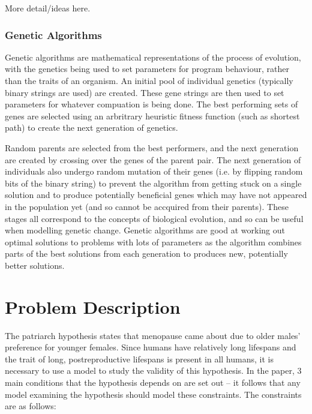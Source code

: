 \documentclass[authoryearcitations]{UoYCSproject}
\begin{document}
\begin{framed}
More detail/ideas here.
\end{framed}


\subsection{Genetic Algorithms}
Genetic algorithms are mathematical representations of the process of evolution, with the genetics being used to set parameters for program behaviour, rather than the traits of an organism. An initial pool of individual genetics (typically binary strings are used) are created. These gene strings are then used to set parameters for whatever compuation is being done. The best performing sets of genes are selected using an arbritrary heuristic fitness function (such as shortest path) to create the next generation of genetics. 

Random parents are selected from the best performers, and the next generation are created by crossing over the genes of the parent pair. The next generation of individuals also undergo random mutation of their genes (i.e. by flipping random bits of the binary string) to prevent the algorithm from getting stuck on a single solution and to produce potentially beneficial genes which may have not appeared in the population yet (and so cannot be accquired from their parents). These stages all correspond to the concepts of biological evolution, and so can be useful when modelling genetic change. Genetic algorithms are good at working out optimal solutions to problems with lots of parameters as the algorithm combines parts of the best solutions from each generation to produces new, potentially better solutions. 

\chapter{Problem Description}
\label{cha:Problem Description}
The patriarch hypothesis \cite{patriarchHypothesis2000} states that menopause came about due to older males' preference for younger females. Since humans have relatively long lifespans and the trait of long, postreproductive lifespans is present in all humans, it is necessary to use a model to study the validity of this hypothesis. In the paper, 3 main conditions that the hypothesis depends on are set out -- it follows that any model examining the hypothesis should model these constraints. The constraints are as follows:
\end{document}
